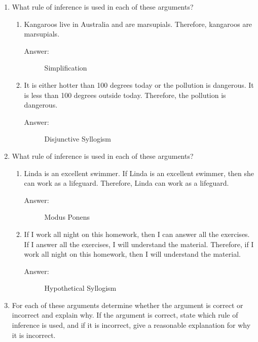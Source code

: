 \documentclass[12pt, oneside]{article}
\begin{document}
\begin{enumerate}

\item What rule of inference is used in each of these arguments?
\begin{enumerate}
    \item Kangaroos live in Australia and are marsupials. Therefore, kangaroos are marsupials.
    \begin{description}
        \item[Answer:] Simplification
    \end{description}
    \item It is either hotter than 100 degrees today or the pollution is dangerous. It is less than 100 degrees outside today. Therefore, the pollution is dangerous.
    \begin{description}
        \item[Answer:] Disjunctive Syllogism
    \end{description}
\end{enumerate}
\item What rule of inference is used in each of these arguments?
\begin{enumerate}
    \item Linda is an excellent swimmer. If Linda is an excellent swimmer, then she can work as a lifeguard. Therefore, Linda can work as a lifeguard.
    \begin{description}
        \item[Answer:] Modus Ponens
    \end{description}
    \item If I work all night on this homework, then I can answer all the exercises. If I answer all the exercises, I will understand the material. Therefore, if I work all night on this homework, then I will understand the material.
    \begin{description}
        \item[Answer:] Hypothetical Syllogism
    \end{description}
\end{enumerate}

\item For each of these arguments determine whether the argument is correct or incorrect and explain why. If the argument is correct, state which rule of inference is used, and if it is incorrect, give a reasonable explanation for why it is incorrect.


\end{enumerate}
\end{document}
